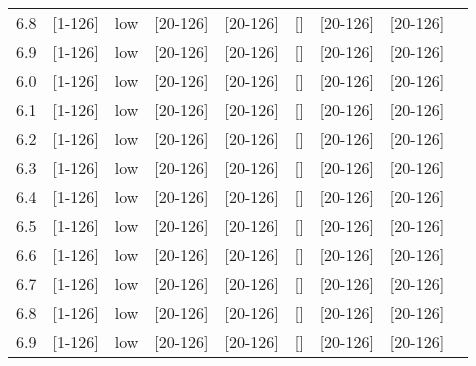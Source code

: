 \documentclass[11pt]{article}
\begin{document}
\begin{tabular}{| l | l | l | l | l | l | l | l | l |}
      6.8 & [1-126] & low & [20-126] & [20-126] & [] & [20-126] & [20-126] &\\
      6.9 & [1-126] & low & [20-126] & [20-126] & [] & [20-126] & [20-126] &\\
      6.0 & [1-126] & low & [20-126] & [20-126] & [] & [20-126] & [20-126] &\\
      6.1 & [1-126] & low & [20-126] & [20-126] & [] & [20-126] & [20-126] &\\
      6.2 & [1-126] & low & [20-126] & [20-126] & [] & [20-126] & [20-126] &\\
      6.3 & [1-126] & low & [20-126] & [20-126] & [] & [20-126] & [20-126] &\\
      6.4 & [1-126] & low & [20-126] & [20-126] & [] & [20-126] & [20-126] &\\
      6.5 & [1-126] & low & [20-126] & [20-126] & [] & [20-126] & [20-126] &\\
      6.6 & [1-126] & low & [20-126] & [20-126] & [] & [20-126] & [20-126] &\\
      6.7 & [1-126] & low & [20-126] & [20-126] & [] & [20-126] & [20-126] &\\
      6.8 & [1-126] & low & [20-126] & [20-126] & [] & [20-126] & [20-126] &\\
      6.9 & [1-126] & low & [20-126] & [20-126] & [] & [20-126] & [20-126] &\\
      \hline
    \end{tabular}
\end{document}
